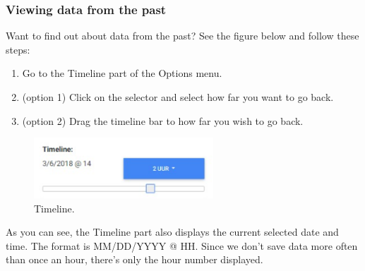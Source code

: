 \documentclass[a4paper]{article}
\begin{document}
\subsubsection*{Viewing data from the past}
Want to find out about data from the past? See the figure below and follow these steps:
\begin{enumerate}
\item Go to the Timeline part of the Options menu.
\item (option 1) Click on the selector and select how far you want to go back.
\item (option 2) Drag the timeline bar to how far you wish to go back.
\end{enumerate}
\begin{figure}[h!]
  \caption{Timeline.}
  \centering
  \includegraphics[width=0.6\textwidth]{timeline}
\end{figure}
As you can see, the Timeline part also displays the current selected date and time. The format is MM/DD/YYYY @ HH. Since we don't save data more often than once an hour, there's only the hour number displayed.

\newpage
\end{document}
